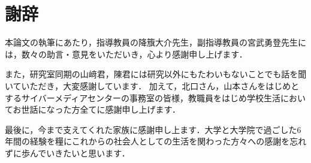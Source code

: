\chapter*{謝辞}
\label{chap:謝辞}
   
    本論文の執筆にあたり，指導教員の降籏大介先生，副指導教員の宮武勇登先生には，数々の助言・意見をいただいき，心より感謝申し上げます．
    
    
    また，研究室同期の山﨑君，陳君には研究以外にもたわいもないことでも話を聞いていただき，大変感謝しています．
    加えて，北口さん，山本さんをはじめとするサイバーメディアセンターの事務室の皆様，教職員をはじめ学校生活においてお世話になった方全てに感謝申し上げます．
    

    最後に，今まで支えてくれた家族に感謝申し上ます．大学と大学院で過ごした6年間の経験を糧にこれからの社会人としての生活を関わった方々への感謝を忘れずに歩んでいきたいと思います．